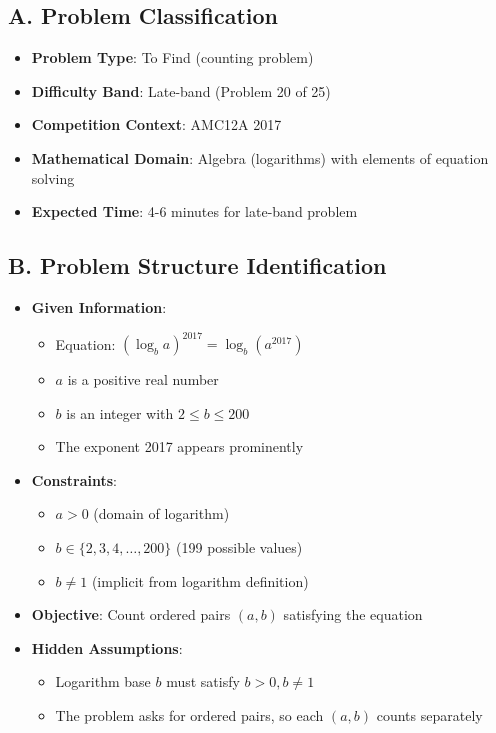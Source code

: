 \documentclass[]{article}
\begin{document}
\begin{problemconfigbox}
\subsection*{A. Problem Classification}
\begin{itemize}[leftmargin=*]
    \item \textbf{Problem Type}: To Find (counting problem)
    \item \textbf{Difficulty Band}: Late-band (Problem 20 of 25)
    \item \textbf{Competition Context}: AMC12A 2017
    \item \textbf{Mathematical Domain}: Algebra (logarithms) with elements of equation solving
    \item \textbf{Expected Time}: 4-6 minutes for late-band problem
\end{itemize}

\subsection*{B. Problem Structure Identification}
\begin{itemize}[leftmargin=*]
    \item \textbf{Given Information}: 
    \begin{itemize}
        \item Equation: $(\log_b a)^{2017}=\log_b(a^{2017})$
        \item $a$ is a positive real number
        \item $b$ is an integer with $2 \leq b \leq 200$
        \item The exponent 2017 appears prominently
    \end{itemize}
    
    \item \textbf{Constraints}: 
    \begin{itemize}
        \item $a > 0$ (domain of logarithm)
        \item $b \in \{2, 3, 4, \ldots, 200\}$ (199 possible values)
        \item $b \neq 1$ (implicit from logarithm definition)
    \end{itemize}
    
    \item \textbf{Objective}: Count ordered pairs $(a,b)$ satisfying the equation
    
    \item \textbf{Hidden Assumptions}: 
    \begin{itemize}
        \item Logarithm base $b$ must satisfy $b > 0, b \neq 1$
        \item The problem asks for ordered pairs, so each $(a,b)$ counts separately
    \end{itemize}
    

\end{itemize}
\end{problemconfigbox}
\end{document}
